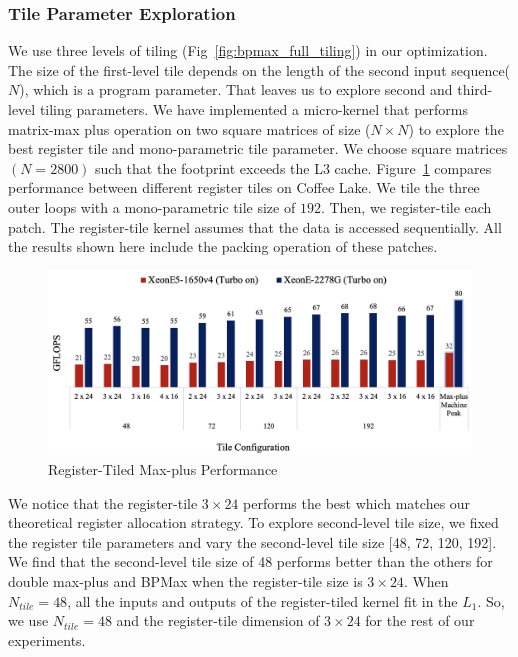 \subsubsection{Tile Parameter Exploration}
We use three levels of tiling (Fig~\ref{fig:bpmax_full_tiling}) in our optimization. The size of the first-level tile depends on the length of the second input sequence($N$), which is a program parameter. That leaves us to explore second and third-level tiling parameters. We have implemented a micro-kernel that performs matrix-max plus operation on two square matrices of size ($N \times N$) to explore the best register tile and mono-parametric tile parameter. We choose square matrices $(N = 2800)$ such that the footprint exceeds the L3 cache. Figure~\ref{fig:register_tile_performance_comparison} compares performance between different register tiles on Coffee Lake. We tile the three outer loops with a mono-parametric tile size of $192$. Then, we register-tile each patch. The register-tile kernel assumes that the data is accessed sequentially. All the results shown here include the packing operation of these patches.
\begin{figure}[htbp]
    \centering
    \includegraphics[scale=0.37, trim=4 4 4 4,clip]{content/figures/max_plus_register_tile_performance_new.png}
   \caption{Register-Tiled Max-plus Performance}
\label{fig:register_tile_performance_comparison}
\end{figure}
We notice that the register-tile $3 \times 24$ performs the best which matches our theoretical register allocation strategy. 
To explore second-level tile size, we fixed the register tile parameters and vary the second-level tile size [48, 72, 120, 192]. We find that the second-level tile size of 48 performs better than the others for double max-plus and BPMax when the register-tile size is $3 \times 24$. When $N_{tile}=48$, all the inputs and outputs of the register-tiled kernel fit in the $L_{1}$. So, we use $N_{tile}=48$ and the register-tile dimension of $3 \times 24$ for the rest of our experiments.
